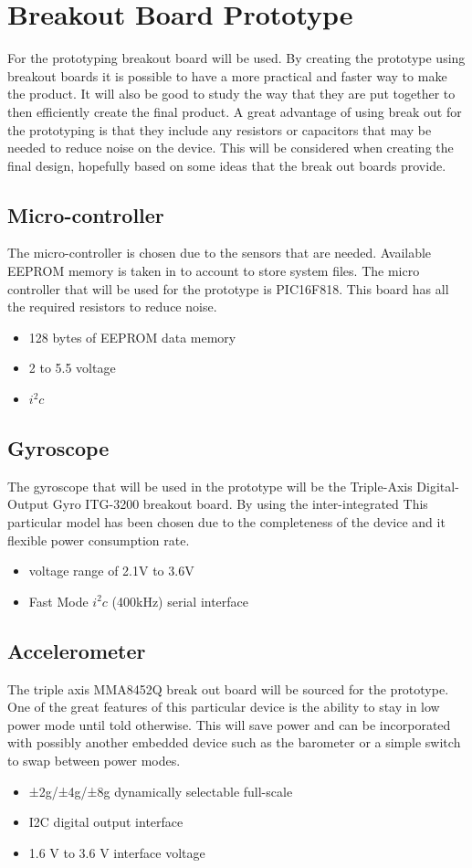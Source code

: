 \documentclass{report}
\begin{document}
\section{Breakout Board Prototype}
For the prototyping breakout board will be used. By creating the prototype using breakout boards it is possible to have a more practical and faster way to make the product. 
It will also be good to study the way that they are put together to then efficiently create the final product. A great advantage of using break out for the prototyping is that they include any resistors or capacitors that may be needed to reduce noise on the device. This will be considered when creating the final design, hopefully based on some ideas that the break out boards provide.
 
\subsection{Micro-controller}
The micro-controller is chosen due to the sensors that are needed. Available EEPROM memory is taken in to account to store system files. The micro controller that will be used for the prototype is PIC16F818. This board has all the required resistors to reduce noise. 
\begin{itemize}
\item 128 bytes of EEPROM data memory
\item 2 to 5.5 voltage
\item $i^2c$
\end{itemize}

\subsection{Gyroscope}
The gyroscope that will be used in the prototype will be the Triple-Axis Digital-Output Gyro ITG-3200 breakout board. By using the inter-integrated 
This particular model has been chosen due to the completeness of the device and it flexible power consumption rate.
\begin{itemize}
\item voltage range of 2.1V to 3.6V
\item Fast Mode $i^2c$ (400kHz) serial interface
\end{itemize}
\subsection{Accelerometer}
The triple axis MMA8452Q break out board will be sourced for the prototype. One of the great features of this particular device is the ability to stay in low power mode until told otherwise. This will save power and can be incorporated with possibly another embedded device such as the barometer or a simple switch to swap between power modes.
\begin{itemize}
\item ±2g/±4g/±8g dynamically selectable full-scale
\item I2C digital output interface
\item 1.6 V to 3.6 V interface voltage
\end{itemize}
\end{document}
